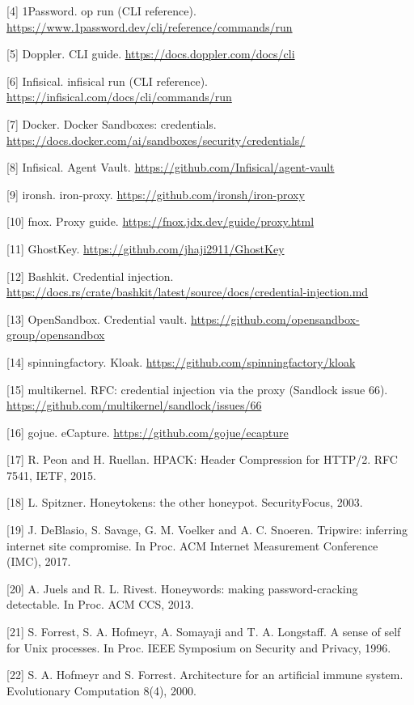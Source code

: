 \documentclass[
  11pt]{article}
\begin{document}
{[}4{]} 1Password. op run (CLI
reference).
\url{https://www.1password.dev/cli/reference/commands/run}

{[}5{]} Doppler. CLI guide.
\url{https://docs.doppler.com/docs/cli}

{[}6{]} Infisical. infisical run (CLI
reference).
\url{https://infisical.com/docs/cli/commands/run}

{[}7{]} Docker. Docker Sandboxes:
credentials.
\url{https://docs.docker.com/ai/sandboxes/security/credentials/}

{[}8{]} Infisical. Agent Vault.
\url{https://github.com/Infisical/agent-vault}

{[}9{]} ironsh. iron-proxy.
\url{https://github.com/ironsh/iron-proxy}

{[}10{]} fnox. Proxy guide.
\url{https://fnox.jdx.dev/guide/proxy.html}

{[}11{]} GhostKey.
\url{https://github.com/jhaji2911/GhostKey}

{[}12{]} Bashkit. Credential injection.
\url{https://docs.rs/crate/bashkit/latest/source/docs/credential-injection.md}

{[}13{]} OpenSandbox. Credential vault.
\url{https://github.com/opensandbox-group/opensandbox}

{[}14{]} spinningfactory. Kloak.
\url{https://github.com/spinningfactory/kloak}

{[}15{]} multikernel. RFC: credential
injection via the proxy (Sandlock issue
66).
\url{https://github.com/multikernel/sandlock/issues/66}

{[}16{]} gojue. eCapture.
\url{https://github.com/gojue/ecapture}

{[}17{]} R. Peon and H. Ruellan. HPACK:
Header Compression for HTTP/2. RFC 7541,
IETF, 2015.

{[}18{]} L. Spitzner. Honeytokens: the
other honeypot. SecurityFocus, 2003.

{[}19{]} J. DeBlasio, S. Savage, G. M.
Voelker and A. C. Snoeren. Tripwire:
inferring internet site compromise. In
Proc. ACM Internet Measurement
Conference (IMC), 2017.

{[}20{]} A. Juels and R. L. Rivest.
Honeywords: making password-cracking
detectable. In Proc. ACM CCS, 2013.

{[}21{]} S. Forrest, S. A. Hofmeyr, A.
Somayaji and T. A. Longstaff. A sense of
self for Unix processes. In Proc. IEEE
Symposium on Security and Privacy, 1996.

{[}22{]} S. A. Hofmeyr and S. Forrest.
Architecture for an artificial immune
system. Evolutionary Computation 8(4),
2000.
\end{document}
